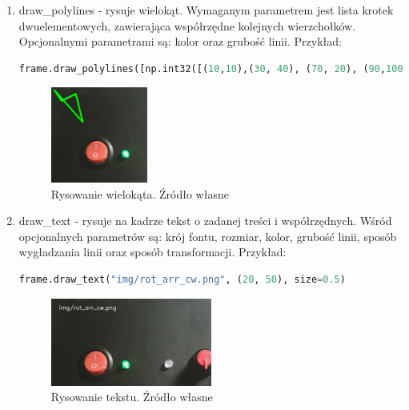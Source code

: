 \documentclass[12pt,twoside,polish]{article}
\begin{document}
\begin{enumerate}[label=\alph*), leftmargin=1.25cm]
\item draw\_polylines - rysuje wielokąt. Wymaganym parametrem jest lista krotek dwuelementowych, zawierająca współrzędne kolejnych wierzchołków. Opcjonalnymi parametrami są: kolor oraz grubość linii. Przykład:
\begin{lstlisting}[language=Python]
frame.draw_polylines([np.int32([(10,10),(30, 40), (70, 20), (90,100)])], color=(0, 255, 0))
\end{lstlisting}
\begin{figure}[h]
	\centering
	\includegraphics[width=0.3\textwidth]{draw_poly}
	\caption{Rysowanie wielokąta. Źródło własne}
\end{figure}

\item draw\_text - rysuje na kadrze tekst o zadanej treści i współrzędnych. Wśród opcjonalnych parametrów są: krój fontu, rozmiar, kolor, grubość linii, sposób wygładzania linii  oraz sposób transformacji. Przykład:
\begin{lstlisting}[language=Python]
frame.draw_text("img/rot_arr_cw.png", (20, 50), size=0.5)
\end{lstlisting}
\begin{figure}[h]
	\centering
	\includegraphics[width=0.5\textwidth]{draw_text}
	\caption{Rysowanie tekstu. Źródło własne}
\end{figure}


\end{enumerate}
\end{document}

